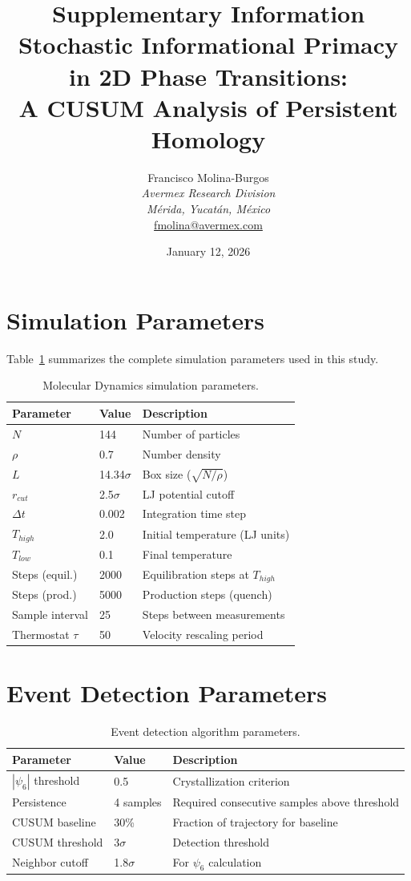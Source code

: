 \documentclass[11pt]{article}
\title{Supplementary Information\\
\large Stochastic Informational Primacy in 2D Phase Transitions:\\
A CUSUM Analysis of Persistent Homology}
\author{Francisco Molina-Burgos\\
\textit{Avermex Research Division}\\
\textit{M\'erida, Yucat\'an, M\'exico}\\
\href{mailto:fmolina@avermex.com}{fmolina@avermex.com}}
\date{January 12, 2026}
\begin{document}
\maketitle

\section{Simulation Parameters}

Table~\ref{tab:params} summarizes the complete simulation parameters used in this study.

\begin{table}[h]
\centering
\caption{Molecular Dynamics simulation parameters.}
\label{tab:params}
\begin{tabular}{lll}
\toprule
\textbf{Parameter} & \textbf{Value} & \textbf{Description} \\
\midrule
$N$ & 144 & Number of particles \\
$\rho$ & 0.7 & Number density \\
$L$ & 14.34$\sigma$ & Box size ($\sqrt{N/\rho}$) \\
$r_{cut}$ & 2.5$\sigma$ & LJ potential cutoff \\
$\Delta t$ & 0.002 & Integration time step \\
$T_{high}$ & 2.0 & Initial temperature (LJ units) \\
$T_{low}$ & 0.1 & Final temperature \\
Steps (equil.) & 2000 & Equilibration steps at $T_{high}$ \\
Steps (prod.) & 5000 & Production steps (quench) \\
Sample interval & 25 & Steps between measurements \\
Thermostat $\tau$ & 50 & Velocity rescaling period \\
\bottomrule
\end{tabular}
\end{table}

\section{Event Detection Parameters}

\begin{table}[h]
\centering
\caption{Event detection algorithm parameters.}
\label{tab:detection}
\begin{tabular}{lll}
\toprule
\textbf{Parameter} & \textbf{Value} & \textbf{Description} \\
\midrule
$|\psi_6|$ threshold & 0.5 & Crystallization criterion \\
Persistence & 4 samples & Required consecutive samples above threshold \\
CUSUM baseline & 30\% & Fraction of trajectory for baseline \\
CUSUM threshold & 3$\sigma$ & Detection threshold \\
Neighbor cutoff & 1.8$\sigma$ & For $\psi_6$ calculation \\
\bottomrule
\end{tabular}
\end{table}
\end{document}
